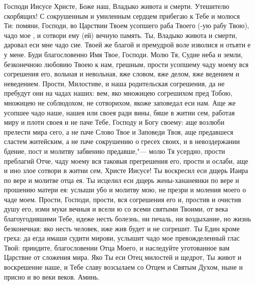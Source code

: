 \begin{mymulticols}


Господи Иисусе Христе, Боже наш, Владыко живота и смерти. Утешителю скорбящих! С сокрушенным и умиленным сердцем прибегаю к Тебе и молюся Ти: помяни, Господи, во Царствии Твоем усопшего раба Твоего (-ую рабу Твою), чадо мое , и сотвори ему (ей) вечную память. Ты, Владыко живота и смерти, даровал еси мне чадо сие. Твоей же благой и премудрой воле изволися и отьяти е у мене. Буди благословенно Имя Твое, Господи. Молю Тя, Судие неба и земли, безконечною любовию Твоею к нам, грешным, прости усопшему чаду моему вся согрешения его, вольная и невольная, яже словом, яже делом, яже ведением и неведением. Прости, Милостиве, и наша родительская согрешения, да не пребудут они на чадах наших: вем, яко множицею согрешихом пред Тобою, множицею не соблюдохом, не сотворихом, якоже заповедал еси нам. Аще же усопшее чадо наше, нашея или своея ради вины, бяше в житии сем, работая миру и плоти своея и не паче Тебе, Господу и Богу своему: аще возлюби прелести мира сего, а не паче Слово Твое и Заповеди Твоя, аще предавшеся сластем житейским, а не паче сокрушению о гресех своих, и в невоздержании бдение, пост и молитву забвению предавше,"--- молю Тя усердно, прости преблагий Отче, чаду моему вся таковыя прегрешения его, прости и ослаби, аще и ино злое сотвори в житии сем, Христе Иисусе! Ты воскресил еси дщерь Иаира по вере и молитве отца ея. Ты исцелил еси дщерь жены-хананеянки по вере и прошению матери ея: услыши убо и молитву мою, не презри и моления моего о чаде моем. Прости, Господи, прости, вся согрешения его и, простив и очистив душу его, изми муки вечныя и всели ю со всеми святыми Твоими, от века благоугодившими Тебе, идеже несть болезнь, ни печаль, ни воздыхание, но жизнь безконечная: яко несть человек, иже жив будет и не согрешит. Ты Един кроме греха: да егда имаши судити мирови, услышит чадо мое превожделенный глас Твой: приидите, благословении Отца Моего, и наследуйте уготованное вам Царствие от сложения мира. Яко Ты еси Отец милостей и щедрот, Ты живот и воскрешение наше, и Тебе славу возсылаем со Отцем и Святым Духом, ныне и присно и во веки веков. Аминь. 

\end{mymulticols}

\mychapterending

